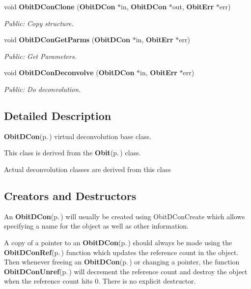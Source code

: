 \begin{CompactItemize}
void {\bf Obit\-DCon\-Clone} ({\bf Obit\-DCon} $\ast$in, {\bf Obit\-DCon} $\ast$out, {\bf Obit\-Err} $\ast$err)
\begin{CompactList}\small\item\em Public: Copy structure. \item\end{CompactList}\item 
void {\bf Obit\-DCon\-Get\-Parms} ({\bf Obit\-DCon} $\ast$in, {\bf Obit\-Err} $\ast$err)
\begin{CompactList}\small\item\em Public: Get Parameters. \item\end{CompactList}\item 
void {\bf Obit\-DCon\-Deconvolve} ({\bf Obit\-DCon} $\ast$in, {\bf Obit\-Err} $\ast$err)
\begin{CompactList}\small\item\em Public: Do deconvolution. \item\end{CompactList}\end{CompactItemize}


\subsection{Detailed Description}
{\bf Obit\-DCon}{\rm (p.\,\pageref{structObitDCon})} virtual deconvolution base class. 

This class is derived from the {\bf Obit}{\rm (p.\,\pageref{structObit})} class.

Actual deconvolution classes are derived from this class\subsection{Creators and Destructors}\label{ObitDCon_8h_ObitDConaccess}
An {\bf Obit\-DCon}{\rm (p.\,\pageref{structObitDCon})} will usually be created using Obit\-DCon\-Create which allows specifying a name for the object as well as other information.

A copy of a pointer to an {\bf Obit\-DCon}{\rm (p.\,\pageref{structObitDCon})} should always be made using the {\bf Obit\-DCon\-Ref}{\rm (p.\,\pageref{ObitDCon_8h_a1})} function which updates the reference count in the object. Then whenever freeing an {\bf Obit\-DCon}{\rm (p.\,\pageref{structObitDCon})} or changing a pointer, the function {\bf Obit\-DCon\-Unref}{\rm (p.\,\pageref{ObitDCon_8h_a0})} will decrement the reference count and destroy the object when the reference count hits 0. There is no explicit destructor.

